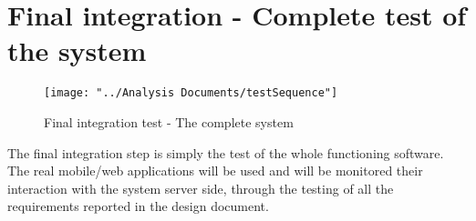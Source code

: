 \section{Final integration - Complete test of the system}

\begin{figure}[H]
	\centering
	\texttt{[image: "../Analysis Documents/testSequence"]}
	\caption{Final integration test - The complete system}
	\label{fig:Ifinal}
\end{figure}

The final integration step is simply the test of the whole functioning software. The real mobile/web applications will be used and will be monitored their interaction with the system server side, through the testing of all the requirements reported in the design document.
